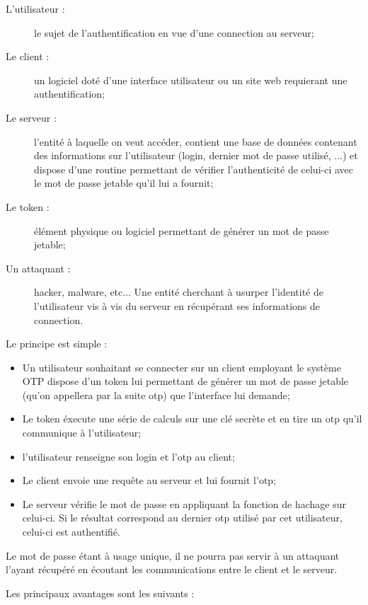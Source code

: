 \documentclass{../res/univ-projet}
\begin{document}
  \begin{description}
    \item[L'utilisateur :] le sujet de l'authentification en vue d'une 
connection au serveur;
    \item[Le client :] un logiciel doté d'une interface utilisateur ou un site 
web requierant une authentification;
    \item[Le serveur :] l'entité à laquelle on veut accéder, contient une base 
de données contenant des informations sur l'utilisateur (login, dernier mot de 
passe utilisé, ...) et dispose d'une routine permettant de vérifier 
l'authenticité de celui-ci avec le mot de passe jetable qu'il lui a fournit;
    \item[Le token :] élément physique ou logiciel permettant de générer un mot 
de passe jetable;
    \item[Un attaquant :] hacker, malware, etc... Une entité cherchant à usurper 
l'identité de l'utilisateur vis à vis du serveur en récupérant ses informations 
de connection.\\
  \end{description}

  Le principe est simple :

  \begin{itemize}
    \item Un utilisateur souhaitant se connecter sur un client employant le 
système OTP dispose d'un token lui permettant de générer un mot de passe jetable 
(qu'on appellera par la suite otp) que l'interface lui demande;
    \item Le token éxecute une série de calculs sur une clé secrète et en tire 
un otp qu'il communique à l'utilisateur;
    \item l'utilisateur renseigne son login et l'otp au client;
    \item Le client envoie une requ\^ete au serveur et lui fournit l'otp; 
    \item Le serveur vérifie le mot de passe en appliquant la fonction de 
hachage sur celui-ci. Si le résultat correspond au dernier otp utilisé par cet 
utilisateur, celui-ci est authentifié.\\
  \end{itemize}

  Le mot de passe étant à usage unique, il ne pourra pas servir à un attaquant 
l'ayant récupéré en écoutant les communications entre le client et le serveur.

  Les principaux avantages sont les suivants :
\end{document}
